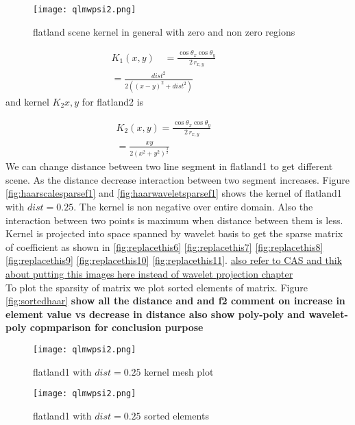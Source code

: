 \begin{figure}[tbh]
\centering{}
\captionsetup{justification=centering}
\texttt{[image: qlmwpsi2.png]}
\caption{\label{fig:replacethis4}flatland scene kernel in general with zero and non zero regions}
\end{figure}


\begin{eqnarray} \label{eq:kernelflatland1}
K_1(x,y)\quad=\frac{   \cos{\theta_x}  \cos{\theta_y}  }{    2\,r_{x,y}   }\quad\quad\quad\\
        =\frac{dist^2}{2((x-y)^2+dist^2)}
\end{eqnarray}
and kernel  $K_2{x,y}$ for flatland2 is

\begin{eqnarray} \label{eq:kernelflatland2}
K_2(x,y)=\frac{\cos{\theta_x}\cos{\theta_y}}{2\,r_{x,y}} \quad\quad\quad\\
=\frac{xy}{2(x^2+y^2)^{\frac{3}{2}}}\quad\quad\quad
\end{eqnarray}
We can change distance between two line segment in flatland1 to get different scene. As the distance decrease interaction between two segment increases. Figure \ref{fig:haarscalesparsef1} and \ref{fig:haarwaveletsparsef1} shows the kernel of flatland1 with $dist=0.25$. The kernel is non negative over entire domain. Also the interaction between two points is maximum when distance between them is less. Kernel is projected into space spanned by wavelet basis to get the sparse matrix of coefficient as shown in \ref{fig:replacethis6} \ref{fig:replacethis7} \ref{fig:replacethis8}\ref{fig:replacethis9} \ref{fig:replacethis10} \ref{fig:replacethis11}. \underline{also refer to CAS and thik about putting this images here instead of wavelet projection chapter} \\

To plot the sparsity of matrix we plot sorted elements of matrix. Figure \ref{fig:sortedhaar}
{\bf show all the distance and and f2 comment on increase in element value vs decrease in distance also show poly-poly and wavelet-poly copmparison for conclusion purpose }

\begin{figure}[tbh]
\centering{}
\captionsetup{justification=centering}
\texttt{[image: qlmwpsi2.png]}
\caption{\label{fig:replacethis5}flatland1 with $dist=0.25$ kernel mesh plot}
\end{figure}
\begin{figure}[tbh]
\centering{}
\captionsetup{justification=centering}
\texttt{[image: qlmwpsi2.png]}
\caption{\label{fig:f10.25sortedhaar}flatland1 with $dist=0.25$ sorted elements}
\end{figure}

